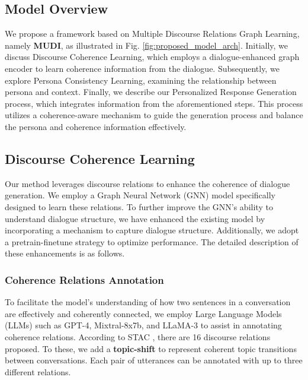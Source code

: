 \documentclass[letterpaper]{article} %
\begin{document}
\subsection{Model Overview}
We propose a framework based on Multiple Discourse Relations Graph Learning, namely \textbf{MUDI}, as illustrated in Fig. \ref{fig:proposed_model_arch}. Initially, we discuss Discourse Coherence Learning, which employs a dialogue-enhanced graph encoder to learn coherence information from the dialogue. Subsequently, we explore Persona Consistency Learning, examining the relationship between persona and context. Finally, we describe our Personalized Response Generation process, which integrates information from the aforementioned steps. This process utilizes a coherence-aware mechanism to guide the generation process and balance the persona and coherence information effectively.

\subsection{Discourse Coherence Learning}
Our method leverages discourse relations to enhance the coherence of dialogue generation. We employ a Graph Neural Network (GNN) model specifically designed to learn these relations. To further improve the GNN's ability to understand dialogue structure, we have enhanced the existing model by incorporating a mechanism to capture dialogue structure. Additionally, we adopt a pretrain-finetune strategy to optimize performance. The detailed description of these enhancements is as follows.


\subsubsection{Coherence Relations Annotation} \label{sec:coherence_reltaions_annotation}
To facilitate the model's understanding of how two sentences in a conversation are effectively and coherently connected, we employ Large Language Models (LLMs) such as GPT-4, Mixtral-8x7b, and LLaMA-3 to assist in annotating coherence relations. According to STAC \cite{asher-etal-2016-discourse}, there are 16 discourse relations proposed. To these, we add a \textbf{topic-shift} to represent coherent topic transitions between conversations. Each pair of utterances can be annotated with up to three different relations.
\end{document}
